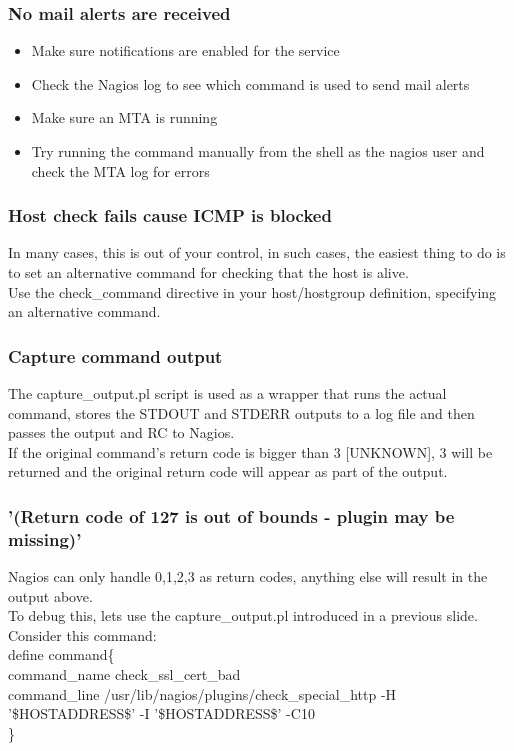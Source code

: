 \documentclass[aspectratio=169]{beamer}
\begin{document}
\begin{frame}
\frametitle{No mail alerts are received}
\bigskip
\begin{itemize}
\item Make sure notifications are enabled for the service 
\item Check the Nagios log to see which command is used to send  mail alerts
\item Make sure an MTA is running
\item Try running the command manually from the shell as the nagios user and check the MTA log for errors
\end{itemize}
\end{frame}

\begin{frame}
\frametitle{Host check fails cause ICMP is blocked}
In many cases, this is out of your control, in such cases, the easiest thing to do is to set an alternative command for checking that the host is alive. \\
Use the check\_command directive in your host/hostgroup definition, specifying an alternative command.
\end{frame}

\begin{frame}
\frametitle{Capture command output}
The capture\_output.pl script is used as a wrapper that runs the actual command, stores the STDOUT and STDERR outputs to a log file and then passes the output and RC to Nagios. \\
If the original command's return code is bigger than 3 [UNKNOWN], 3 will be returned and the original return code will appear as part of the output.
\end{frame}

\begin{frame}
\frametitle{'(Return code of 127 is out of bounds - plugin may be missing)'}
Nagios can only handle 0,1,2,3 as return codes, anything else will result in the output above. \\
To debug this, lets use the capture\_output.pl introduced in a previous slide. \\
\bigskip
Consider this command: \\ 
define command\{ \\

    command\_name check\_ssl\_cert\_bad \\
    command\_line   /usr/lib/nagios/plugins/check\_special\_http -H '\$HOSTADDRESS\$' -I '\$HOSTADDRESS\$' -C10 \\
\} 

\end{frame}
\end{document}
